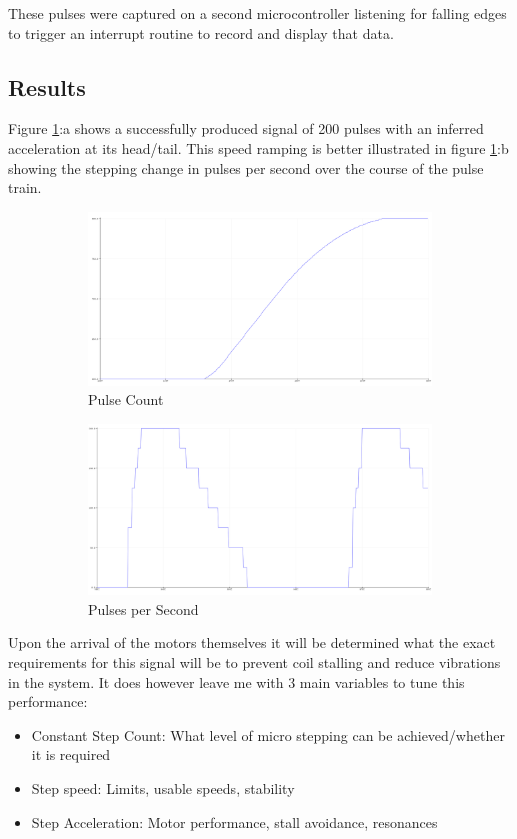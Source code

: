 These pulses were captured on a second microcontroller listening for falling edges to trigger an interrupt routine to record and display that data.

\subsection{Results}

Figure \ref{fig:code}:a shows a successfully produced signal of 200 pulses with an inferred acceleration at its head/tail. This speed ramping is better illustrated in figure \ref{fig:code}:b showing the stepping change in pulses per second over the course of the pulse train.

\begin{figure}[h]
    \centering
    \begin{subfigure}{.45\textwidth}
      \centering
      \includegraphics[width=0.8\linewidth]{img/stepper_pulses.PNG}
      \caption{Pulse Count}
    \end{subfigure}%
    \begin{subfigure}{.45\textwidth}
      \centering
      \includegraphics[width=0.8\linewidth]{img/stepper_pulse_acc.PNG}
      \caption{Pulses per Second}
    \end{subfigure}
    \caption{}
    \label{fig:code}
  \end{figure}

  Upon the arrival of the motors themselves it will be determined what the exact requirements for this signal will be to prevent coil stalling and reduce vibrations in the system. It does however leave me with 3 main variables to tune this performance:
  \begin{itemize}
      \item Constant Step Count: What level of micro stepping can be achieved/whether it is required 
      \item Step speed: Limits, usable speeds, stability
      \item Step Acceleration: Motor performance, stall avoidance, resonances
  \end{itemize} 
